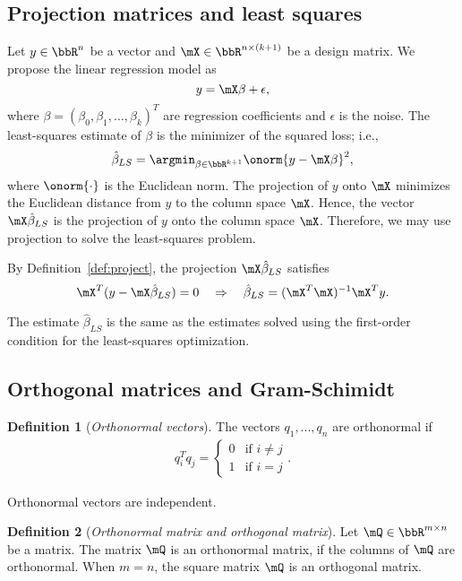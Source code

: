 \documentclass[11pt]{article}
\theoremstyle{plain}
\theoremstyle{definition}
\newtheorem{defn}{Definition}
\begin{document}
\subsection{Projection matrices and least squares}
Let $y \in \bbR^n$ be a vector and $\mX \in \bbR^{n \times (k+1)}$ be a design matrix. We propose the linear regression model as
\[ y = \mX \beta +\epsilon,\]
where $\beta = (\beta_0,\beta_1,...,\beta_k)^T$ are regression coefficients and $\epsilon$ is the noise. The least-squares estimate of $\beta$ is the minimizer of the squared loss; i.e.,
\[  \hat \beta_{LS} = \argmin_{\beta \in \bbR^{k+1}} \onorm{y - \mX \beta}^2, \]
where $\onorm{\cdot}$ is the Euclidean norm.  The projection of $y$ onto $\mX$ minimizes the Euclidean distance from $y$ to the column space $\mX$. Hence, the vector $\mX \hat \beta_{LS}$ is the projection of $y$ onto the column space $\mX$. Therefore, we may use projection to solve the least-squares problem. 

By Definition~\ref{def:project}, the projection $\mX \hat \beta_{LS}$ satisfies
\[ \mX^T( y - \mX \hat \beta_{LS} ) = 0 \quad \Rightarrow \quad \hat \beta_{LS} = (\mX^T \mX)^{-1} \mX^T y. \]

The estimate $\hat \beta_{LS}$ is the same as the estimates solved using the first-order condition for the least-squares optimization. 

\subsection{Orthogonal matrices and Gram-Schimidt}
\begin{defn}[\textit{Orthonormal vectors}]\label{def:othronov}
	The vectors $q_1,...,q_n$ are orthonormal if
	\begin{align}
		q_i^T q_j = \begin{cases}
			0& \text{if } i\neq j\\
			1 & \text{if } i =  j
		\end{cases}.
	\end{align}
\end{defn}

Orthonormal vectors are independent.

\begin{defn}[\textit{Orthonormal matrix and orthogonal matrix}]\label{def:orthonom}
	Let  $\mQ \in \bbR^{m \times n}$ be a matrix. The matrix $\mQ$ is an orthonormal matrix, if the columns of $\mQ$ are orthonormal. When $ m= n$, the square matrix $\mQ$ is an orthogonal matrix.
\end{defn}
\end{document}
